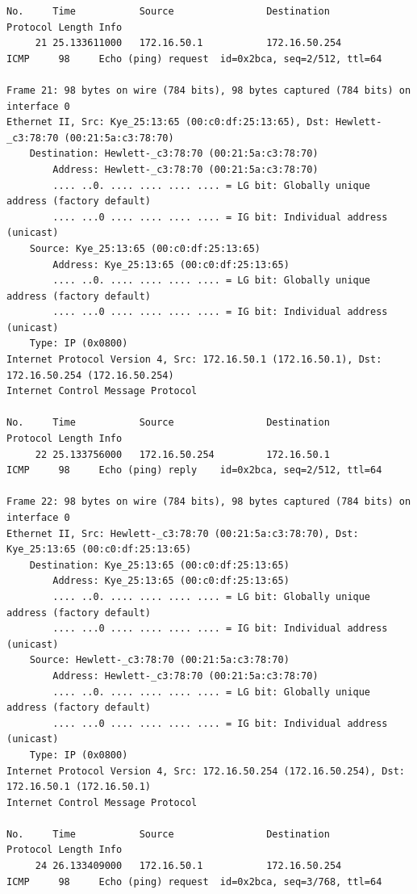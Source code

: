 \documentclass[a4paper,11pt]{article}
\begin{document}
\begin{lstlisting}
No.     Time           Source                Destination           Protocol Length Info
     21 25.133611000   172.16.50.1           172.16.50.254         ICMP     98     Echo (ping) request  id=0x2bca, seq=2/512, ttl=64

Frame 21: 98 bytes on wire (784 bits), 98 bytes captured (784 bits) on interface 0
Ethernet II, Src: Kye_25:13:65 (00:c0:df:25:13:65), Dst: Hewlett-_c3:78:70 (00:21:5a:c3:78:70)
    Destination: Hewlett-_c3:78:70 (00:21:5a:c3:78:70)
        Address: Hewlett-_c3:78:70 (00:21:5a:c3:78:70)
        .... ..0. .... .... .... .... = LG bit: Globally unique address (factory default)
        .... ...0 .... .... .... .... = IG bit: Individual address (unicast)
    Source: Kye_25:13:65 (00:c0:df:25:13:65)
        Address: Kye_25:13:65 (00:c0:df:25:13:65)
        .... ..0. .... .... .... .... = LG bit: Globally unique address (factory default)
        .... ...0 .... .... .... .... = IG bit: Individual address (unicast)
    Type: IP (0x0800)
Internet Protocol Version 4, Src: 172.16.50.1 (172.16.50.1), Dst: 172.16.50.254 (172.16.50.254)
Internet Control Message Protocol

No.     Time           Source                Destination           Protocol Length Info
     22 25.133756000   172.16.50.254         172.16.50.1           ICMP     98     Echo (ping) reply    id=0x2bca, seq=2/512, ttl=64

Frame 22: 98 bytes on wire (784 bits), 98 bytes captured (784 bits) on interface 0
Ethernet II, Src: Hewlett-_c3:78:70 (00:21:5a:c3:78:70), Dst: Kye_25:13:65 (00:c0:df:25:13:65)
    Destination: Kye_25:13:65 (00:c0:df:25:13:65)
        Address: Kye_25:13:65 (00:c0:df:25:13:65)
        .... ..0. .... .... .... .... = LG bit: Globally unique address (factory default)
        .... ...0 .... .... .... .... = IG bit: Individual address (unicast)
    Source: Hewlett-_c3:78:70 (00:21:5a:c3:78:70)
        Address: Hewlett-_c3:78:70 (00:21:5a:c3:78:70)
        .... ..0. .... .... .... .... = LG bit: Globally unique address (factory default)
        .... ...0 .... .... .... .... = IG bit: Individual address (unicast)
    Type: IP (0x0800)
Internet Protocol Version 4, Src: 172.16.50.254 (172.16.50.254), Dst: 172.16.50.1 (172.16.50.1)
Internet Control Message Protocol

No.     Time           Source                Destination           Protocol Length Info
     24 26.133409000   172.16.50.1           172.16.50.254         ICMP     98     Echo (ping) request  id=0x2bca, seq=3/768, ttl=64


\end{lstlisting}
\end{document}
